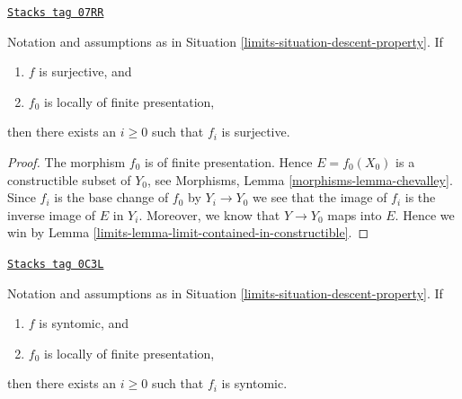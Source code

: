 \begin{lemma}
\label{limits-lemma-descend-surjective}
\href{https://stacks.math.columbia.edu/tag/07RR}{\texttt{Stacks tag 07RR}}

Notation and assumptions as in Situation \ref{limits-situation-descent-property}.
If
\begin{enumerate}
\item $f$ is surjective, and
\item $f_0$ is locally of finite presentation,
\end{enumerate}
then there exists an $i \geq 0$ such that $f_i$ is surjective.
\end{lemma}

\begin{proof}

The morphism $f_0$ is of finite presentation.
Hence $E = f_0(X_0)$ is a constructible subset of $Y_0$, see
Morphisms, Lemma \ref{morphisms-lemma-chevalley}.
Since $f_i$ is the base change of $f_0$ by
$Y_i \to Y_0$ we see that the image of $f_i$ is the
inverse image of $E$ in $Y_i$. Moreover, we know that
$Y \to Y_0$ maps into $E$. Hence we win by
Lemma \ref{limits-lemma-limit-contained-in-constructible}.
\end{proof}

\begin{lemma}
\label{limits-lemma-descend-syntomic}
\href{https://stacks.math.columbia.edu/tag/0C3L}{\texttt{Stacks tag 0C3L}}

Notation and assumptions as in Situation \ref{limits-situation-descent-property}.
If
\begin{enumerate}
\item $f$ is syntomic, and
\item $f_0$ is locally of finite presentation,
\end{enumerate}
then there exists an $i \geq 0$ such that $f_i$ is syntomic.
\end{lemma}

